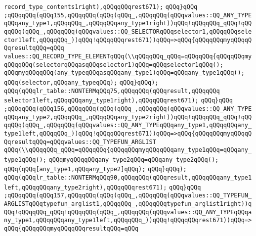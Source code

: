 \verb|record_type_contents1right),qQQqqQQqrest671);|\newline
\verb|qQQq}qQQq|\newline
\verb|;qQQqqQQq(qQQq155,qQQqqQQq(qQQq(qQQq_,qQQqqQQq(qQQqvalues::QQ_ANY_TYPEqQQqany_type1,qQQqqQQq_,qQQqqQQqany_type1right))qQQq!qQQqqQQq_qQQq!qQQqqQQq(qQQq_,qQQqqQQq(qQQqvalues::QQ_SELECTORqQQqselector1,qQQqqQQqselector1left,qQQqqQQq_))qQQq!qQQqqQQqrest671))qQQq=>qQQq{qQQqqQQqmyqQQqqQQqresultqQQq=qQQq|\newline
\verb|values::QQ_RECORD_TYPE_ELEMENTqQQq(\\qQQqqQQq_qQQq=qQQqqQQq{qQQqqQQqmyqQQqqQQq(selectorqQQqasqQQqselector1)qQQq=qQQqselector1qQQq();|\newline
\verb|qQQqmyqQQqqQQq(any_typeqQQqasqQQqany_type1)qQQq=qQQqany_type1qQQq();|\newline
\verb|qQQq(selector,qQQqany_typeqQQq);|\newline
\verb|qQQq}qQQq);|\newline
\verb|qQQq(qQQqlr_table::NONTERMqQQq75,qQQqqQQq(qQQqresult,qQQqqQQq|\newline
\verb|selector1left,qQQqqQQqany_type1right),qQQqqQQqrest671);|\newline
\verb|qQQq}qQQq|\newline
\verb|;qQQqqQQq(qQQq156,qQQqqQQq(qQQq(qQQq_,qQQqqQQq(qQQqvalues::QQ_ANY_TYPEqQQqany_type2,qQQqqQQq_,qQQqqQQqany_type2right))qQQq!qQQqqQQq_qQQq!qQQqqQQq(qQQq_,qQQqqQQq(qQQqvalues::QQ_ANY_TYPEqQQqany_type1,qQQqqQQqany_type1left,qQQqqQQq_))qQQq!qQQqqQQqrest671))qQQq=>qQQq{qQQqqQQqmyqQQqqQQqresultqQQq=qQQqvalues::QQ_TYPEFUN_ARGLIST|\newline
\verb|qQQq(\\qQQqqQQq_qQQq=qQQqqQQq{qQQqqQQqmyqQQqqQQqany_type1qQQq=qQQqany_type1qQQq();|\newline
\verb|qQQqmyqQQqqQQqany_type2qQQq=qQQqany_type2qQQq();|\newline
\verb|qQQq(qQQq[any_type1,qQQqany_type2]qQQq);|\newline
\verb|qQQq}qQQq);|\newline
\verb|qQQq(qQQqlr_table::NONTERMqQQq90,qQQqqQQq(qQQqresult,qQQqqQQqany_type1left,qQQqqQQqany_type2right),qQQqqQQqrest671);|\newline
\verb|qQQq}qQQq|\newline
\verb|;qQQqqQQq(qQQq157,qQQqqQQq(qQQq(qQQq_,qQQqqQQq(qQQqvalues::QQ_TYPEFUN_ARGLISTqQQqtypefun_arglist1,qQQqqQQq_,qQQqqQQqtypefun_arglist1right))qQQq!qQQqqQQq_qQQq!qQQqqQQq(qQQq_,qQQqqQQq(qQQqvalues::QQ_ANY_TYPEqQQqany_type1,qQQqqQQqany_type1left,qQQqqQQq_))qQQq!qQQqqQQqrest671))qQQq=>qQQq{qQQqqQQqmyqQQqqQQqresultqQQq=qQQq|\newline
